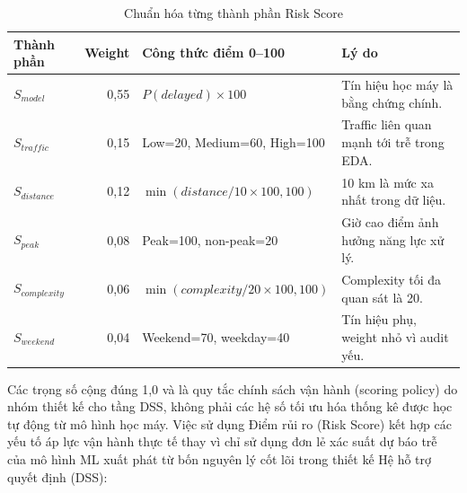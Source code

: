 \documentclass[12pt,a4paper,oneside]{report}
\begin{document}
\begin{table}[H]
\centering
\caption{Chuẩn hóa từng thành phần Risk Score}
\small
\begin{tabularx}{\linewidth}{lrlX}
\toprule
Thành phần & Weight & Công thức điểm 0--100 & Lý do\\
\midrule
\(S_{model}\) & 0,55 & \(P(delayed)\times100\) & Tín hiệu học máy là bằng chứng chính.\\
\(S_{traffic}\) & 0,15 & Low=20, Medium=60, High=100 & Traffic liên quan mạnh tới trễ trong EDA.\\
\(S_{distance}\) & 0,12 & \(\min(distance/10\times100,100)\) & 10 km là mức xa nhất trong dữ liệu.\\
\(S_{peak}\) & 0,08 & Peak=100, non-peak=20 & Giờ cao điểm ảnh hưởng năng lực xử lý.\\
\(S_{complexity}\) & 0,06 & \(\min(complexity/20\times100,100)\) & Complexity tối đa quan sát là 20.\\
\(S_{weekend}\) & 0,04 & Weekend=70, weekday=40 & Tín hiệu phụ, weight nhỏ vì audit yếu.\\
\bottomrule
\end{tabularx}
\end{table}

Các trọng số cộng đúng 1,0 và là quy tắc chính sách vận hành (scoring policy) do nhóm thiết kế cho tầng DSS, không phải các hệ số tối ưu hóa thống kê được học tự động từ mô hình học máy. Việc sử dụng Điểm rủi ro (Risk Score) kết hợp các yếu tố áp lực vận hành thực tế thay vì chỉ sử dụng đơn lẻ xác suất dự báo trễ của mô hình ML xuất phát từ bốn nguyên lý cốt lõi trong thiết kế Hệ hỗ trợ quyết định (DSS):
\end{document}
